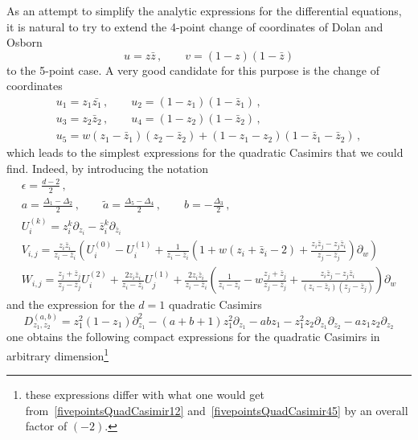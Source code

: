 \documentclass{article}
\begin{document}
	\medskip
	As an attempt to simplify the analytic expressions for the differential equations, it is natural to try to extend the 4-point change of coordinates of Dolan and Osborn~\cite{Dolan:2003hv,Dolan:2011dv}
	\begin{equation}
	    u=z \bar{z}\,, \qquad v=(1-z)(1-\bar{z})
	\end{equation}
    to the 5-point case. A very good candidate for this purpose is the change of coordinates
    \begin{equation}
        \begin{gathered}
        u_1=z_1 \bar{z_1}\,,\qquad u_2=(1-z_1)(1-\bar{z}_1)\,,\\
    u_3=z_2 \bar{z}_2\,, \qquad u_4=(1-z_2)(1-\bar{z}_2)\,,\\
    u_5=w(z_1-\bar{z}_1)(z_2-\bar{z}_2)+(1-z_1-z_2)(1-\bar{z}_1-\bar{z}_2)\,,
        \end{gathered}
    \end{equation}
    which leads to the simplest expressions for the quadratic Casimirs that we could find. Indeed, by introducing the notation
    \begin{gather}
    \epsilon=\frac{d-2}{2}\,,\\
        a=\frac{\Delta_1-\Delta_2}{2}\,, \qquad \tilde{a}=\frac{\Delta_5-\Delta_4}{2}\,, \qquad b=-\frac{\Delta_3}{2}\,,\\
        U_i^{(k)}=z_i^k\partial_{z_i}-\bar{z}_i^k\partial_{\bar{z}_i}\\
        V_{i,j}=\frac{z_i\bar{z}_i}{z_i-\bar{z}_i}\left( U_i^{(0)}-U_i^{(1)}+\frac{1}{z_i-\bar{z}_i}\left(1+w(z_i+\bar{z}_i-2)+\frac{z_i\bar{z}_j-z_j\bar{z}_i}{z_j-\bar{z}_j}\right)\partial_w\right)\\
        W_{i,j}=\frac{z_j+\bar{z}_j}{z_j-\bar{z}_j}U_i^{(2)}+\frac{2z_i\bar{z}_i}{z_i-\bar{z}_i}U_j^{(1)}+\frac{2z_i\bar{z}_i}{z_i-\bar{z}_i}\left(\frac{1}{z_i-\bar{z}_i}-w\frac{z_j+\bar{z}_j}{z_j-\bar{z}_j}+\frac{z_i\bar{z}_j-z_j\bar{z}_i}{(z_i-\bar{z}_i)(z_j-\bar{z}_j)}\right)\partial_w
    \end{gather}
    and the expression for the $d=1$ quadratic Casimirs
    \begin{equation}
        D_{z_1,z_2}^{(a,b)}=z_1^2(1-z_1)\partial_{z_1}^2-(a+b+1)z_1^2\partial_{z_1}-a b z_1-z_1^2 z_2 \partial_{z_1}\partial_{z_2}-a z_1 z_2 \partial_{z_2}
    \end{equation}
    one obtains the following compact expressions for the quadratic Casimirs in arbitrary dimension\footnote{these expressions differ with what one would get from~\eqref{fivepointsQuadCasimir12} and~\eqref{fivepointsQuadCasimir45} by an overall factor of $(-2).$}
\end{document}
